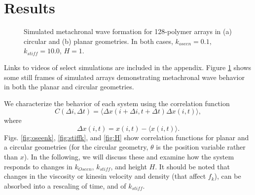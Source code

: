 \documentclass[11pt]{ucthesis}
\begin{document}
\section{Results}
\label{sec:results}

\begin{figure}
\centering
{}
\qquad
{}
\caption{Simulated metachronal wave formation for 128-polymer arrays in (a) circular and (b) planar geometries. 
In both cases, $k_{oseen} = 0.1$, $k_{stiff}  = 10.0$, $H=1$.
\label{fig:anims}}
\end{figure}
Links to videos of select simulations are included in the appendix. Figure \ref{fig:anims} shows some still frames of simulated
arrays demonstrating metachronal wave behavior in both the planar
and circular geometries.

We characterize the behavior of each system using the correlation function 
\begin{equation}
C(\Delta i, \Delta t) = \langle \Delta x(i + \Delta i, t+\Delta t)\Delta x(i,t)\rangle,
\end{equation}
where
\[
\Delta x(i,t) = x(i,t) - \langle x(i,t)\rangle.
\]
Figs.  \ref{fig:oseenk}, \ref{fig:stiffk}, and \ref{fig:H} 
show correlation functions for planar
and a circular geometries (for the circular geometry, $\theta$ is
the position variable rather than $x$). 
In the following, we will discuss these and examine how the system responds to changes in $k_{Oseen}$,
$k_{stiff}$, and height $H$. It should be noted that changes in the viscosity or kinesin velocity and density 
(that affect $f_k$), can be absorbed into a rescaling of time, and of $k_{stiff}$.
\end{document}
